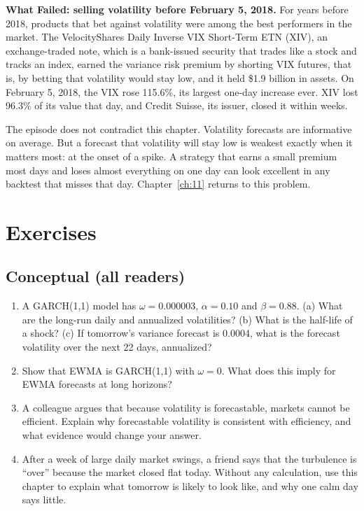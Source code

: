 \begin{callout}
\textbf{What Failed: selling volatility before February 5, 2018.} For years before 2018, products that bet against volatility were among the best performers in the market. The VelocityShares Daily Inverse VIX Short-Term ETN (XIV), an exchange-traded note, which is a bank-issued security that trades like a stock and tracks an index, earned the variance risk premium by shorting VIX futures, that is, by betting that volatility would stay low, and it held \$1.9 billion in assets. On February 5, 2018, the VIX rose 115.6\%, its largest one-day increase ever. XIV lost 96.3\% of its value that day, and Credit Suisse, its issuer, closed it within weeks.

The episode does not contradict this chapter. Volatility forecasts are informative on average. But a forecast that volatility will stay low is weakest exactly when it matters most: at the onset of a spike. A strategy that earns a small premium most days and loses almost everything on one day can look excellent in any backtest that misses that day. Chapter~\ref{ch:11} returns to this problem.
\end{callout}

\section*{Exercises}

\subsection*{Conceptual (all readers)}

\begin{enumerate}
  \item A GARCH(1,1) model has $\omega = 0.000003$, $\alpha = 0.10$ and $\beta = 0.88$. (a) What are the long-run daily and annualized volatilities? (b) What is the half-life of a shock? (c) If tomorrow's variance forecast is 0.0004, what is the forecast volatility over the next 22 days, annualized?
  \item Show that EWMA is GARCH(1,1) with $\omega = 0$. What does this imply for EWMA forecasts at long horizons?
  \item A colleague argues that because volatility is forecastable, markets cannot be efficient. Explain why forecastable volatility is consistent with efficiency, and what evidence would change your answer.
  \item After a week of large daily market swings, a friend says that the turbulence is ``over'' because the market closed flat today. Without any calculation, use this chapter to explain what tomorrow is likely to look like, and why one calm day says little.
\end{enumerate}

